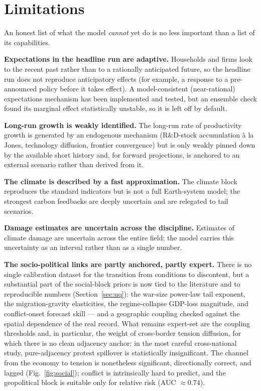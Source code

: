\documentclass[11pt,a4paper]{article}
\begin{document}
\section{Limitations}
\label{sec:limits}

An honest list of what the model \emph{cannot} yet do is no less important than a list of its
capabilities.

\textbf{Expectations in the headline run are adaptive.} Households and firms look to the recent past
rather than to a rationally anticipated future, so the headline run does not reproduce anticipatory
effects (for example, a response to a pre-announced policy before it takes effect). A model-consistent
(near-rational) expectations mechanism has been implemented and tested, but an ensemble check found its
marginal effect statistically unstable, so it is left off by default.

\textbf{Long-run growth is weakly identified.} The long-run rate of productivity growth is generated
by an endogenous mechanism (R\&D-stock accumulation à la Jones, technology diffusion, frontier
convergence) but is only weakly pinned down by the available short history and, for forward
projections, is anchored to an external scenario rather than derived from it.

\textbf{The climate is described by a fast approximation.} The climate block reproduces the standard
indicators but is not a full Earth-system model; the strongest carbon feedbacks are deeply uncertain
and are relegated to tail scenarios.

\textbf{Damage estimates are uncertain across the discipline.} Estimates of climate damage are
uncertain across the entire field; the model carries this uncertainty as an interval rather than as
a single number.

\textbf{The socio-political links are partly anchored, partly expert.} There is no single calibration
dataset for the transition from conditions to discontent, but a substantial part of the social-block
priors is now tied to the literature and to reproducible numbers (Section~\ref{sec:uq}): the war-size
power-law tail exponent, the migration-gravity elasticities, the regime-collapse GDP-loss magnitude,
and conflict-onset forecast skill --- and a geographic coupling checked against the spatial dependence
of the real record. What remains expert-set are the coupling thresholds and, in particular, the weight
of cross-border tension diffusion, for which there is no clean adjacency anchor: in the most careful
cross-national study, pure-adjacency protest spillover is statistically insignificant. The channel from
the economy to tension is nonetheless significant, directionally correct, and lagged
(Fig.~\ref{fig:social}); conflict is intrinsically hard to predict, and the geopolitical block is
suitable only for relative risk (AUC ${\approx}0.74$).
\end{document}
